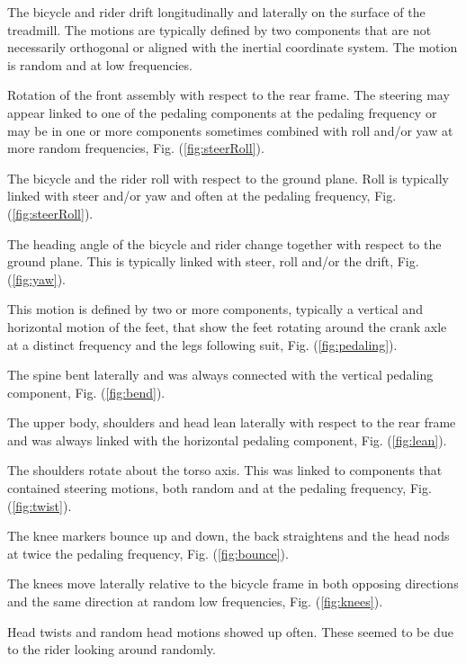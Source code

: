 \begin{description}[Pedaling]
    \item[Drift] The bicycle and rider drift longitudinally and laterally on
        the surface of the treadmill. The motions are typically defined by two
        components that are not necessarily orthogonal or aligned with the
        inertial coordinate system. The motion is random and at low
        frequencies.
    \item[Steer] Rotation of the front assembly with respect to the rear frame.
        The steering may appear linked to one of the pedaling components at the
        pedaling frequency or may be in one or more components sometimes
        combined with roll and/or yaw at more random frequencies, Fig.
        (\ref{fig:steerRoll}).
    \item[Roll] The bicycle and the rider roll with respect to the ground
        plane. Roll is typically linked with steer and/or yaw and often at the
        pedaling frequency, Fig. (\ref{fig:steerRoll}).
    \item[Yaw] The heading angle of the bicycle and rider change together with
        respect to the ground plane. This is typically linked with steer, roll
        and/or the drift, Fig. (\ref{fig:yaw}).
    \item[Pedaling] This motion is defined by two or more components, typically
        a vertical and horizontal motion of the feet, that show the feet
        rotating around the crank axle at a distinct frequency and the legs
        following suit, Fig. (\ref{fig:pedaling}).
    \item[Bend] The spine bent laterally and was always connected with the
        vertical pedaling component, Fig. (\ref{fig:bend}).
    \item[Lean] The upper body, shoulders and head lean laterally with respect
        to the rear frame and was always linked with the horizontal pedaling
        component, Fig. (\ref{fig:lean}).
    \item[Twist] The shoulders rotate about the torso axis. This was linked to
        components that contained steering motions, both random and at the
        pedaling frequency, Fig. (\ref{fig:twist}).
    \item[Bounce] The knee markers bounce up and down, the back straightens and
        the head nods at twice the pedaling frequency, Fig.
        (\ref{fig:bounce}).
    \item[Knees] The knees move laterally relative to the bicycle frame in both
        opposing directions and the same direction at random low frequencies,
        Fig. (\ref{fig:knees}).
    \item[Head] Head twists and random head motions showed up often. These
        seemed to be due to the rider looking around randomly.
\end{description}
